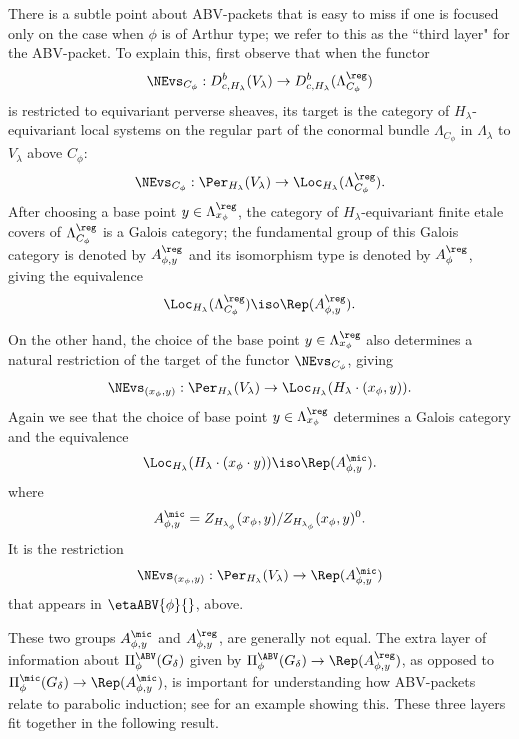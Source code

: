 \documentclass[11pt,letterpaper]{amsart}
\numberwithin{equation}{section}
\begin{document}
There is a subtle point about ABV-packets that is easy to miss if one is focused only on the case when $\phi$ is of Arthur type; we refer to this as the ``third layer" for the ABV-packet.
To explain this, first observe that when the functor 
\begin{equation}\label{intro: NEvs}
\NEvs_{C_\phi} : D^b_{c,H_\lambda}(V_\lambda) \to D^b_{c,H_\lambda}(\Lambda^\reg_{C_\phi})
\end{equation}
is restricted to equivariant perverse sheaves, its target is the category of $H_\lambda$-equivariant local systems on the regular part of the conormal bundle $\Lambda_{C_\phi}$ in $\Lambda_\lambda$ to $V_{\lambda}$ above $C_\phi$:
\begin{equation}\label{intro: NEvs 1}
\NEvs_{C_\phi} : \Per_{H_\lambda}(V_\lambda) \to \Loc_{H_\lambda}(\Lambda^\reg_{C_\phi}).
\end{equation}
After choosing a base point $y\in \Lambda^\reg_{x_\phi}$, the category of $H_\lambda$-equivariant finite etale covers of $\Lambda^\reg_{C_\phi}$ is a Galois category; the fundamental group of this Galois category is denoted by $A^\reg_{\phi,y}$ and its isomorphism type is denoted by $A^\reg_{\phi}$, giving the equivalence
\begin{equation}
\Loc_{H_\lambda}(\Lambda^\reg_{C_\phi})
\iso \Rep(A_{\phi,y}^\reg).
\end{equation}

On the other hand, the choice of the base point $y\in \Lambda_{x_\phi}^\reg$ also determines a natural restriction of the target of the functor $\NEvs_{C_\phi}$, giving 
\begin{equation}\label{intro: NEvs 2}
{\NEvs_{(x_\phi,y)}}  : \Per_{H_\lambda}(V_\lambda) \to \Loc_{H_\lambda}(H_{\lambda}\cdot(x_\phi,y)).
\end{equation}
Again we see that the choice
of base point $y\in \Lambda_{x_\phi}^\reg$ determines a Galois category and the equivalence
\[
\Loc_{H_\lambda}(H_\lambda\cdot (x_\phi\cdot y)) 
\iso
\Rep(A^\mic_{\phi,y}).
\]
where  
\[
A^\mic_{\phi,y} =
Z_{H_{\lambda_\phi}}(x_\phi,y)/Z_{H_{\lambda_\phi}}(x_\phi,y)^0.
\]
It is the restriction 
\begin{equation}\label{intro: NEvs 3}
{\NEvs_{(x_\phi,y)}}  : \Per_{H_\lambda}(V_\lambda) \to \Rep(A^\mic_{\phi,y})
\end{equation}
that appears in $\etaABV{\phi}{}$, above.

These two groups {$A_{\phi,y}^\mic$} and $A_{\phi,y}^\reg$,  are generally not equal.
The extra layer of information about $\Pi^\ABV_\phi(G_\delta)$ given by $\Pi^\ABV_\phi(G_\delta) \to \Rep(A^\reg_{\phi,y})$, as opposed to $\Pi^\mic_\phi(G_\delta) \to \Rep(A^\mic_{\phi,y})$, is important for understanding how ABV-packets relate to parabolic induction; see \cite{CFK22} for an example showing this. 
These three layers fit together in the following result.
\end{document}

